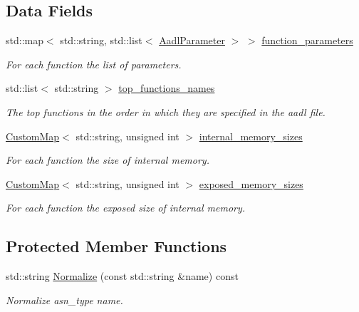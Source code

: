 \subsection*{Data Fields}
\begin{DoxyCompactItemize}
\item 
std\+::map$<$ std\+::string, std\+::list$<$ \hyperlink{structAadlInformation_1_1AadlParameter}{Aadl\+Parameter} $>$ $>$ \hyperlink{classAadlInformation_a3fd7b442c01a24407e5d51f2a1dc10f0}{function\+\_\+parameters}
\begin{DoxyCompactList}\small\item\em For each function the list of parameters. \end{DoxyCompactList}\item 
std\+::list$<$ std\+::string $>$ \hyperlink{classAadlInformation_a0fdd00ee4efacb6e9ff75022645321be}{top\+\_\+functions\+\_\+names}
\begin{DoxyCompactList}\small\item\em The top functions in the order in which they are specified in the aadl file. \end{DoxyCompactList}\item 
\hyperlink{custom__map_8hpp_a18ca01763abbe3e5623223bfe5aaac6b}{Custom\+Map}$<$ std\+::string, unsigned int $>$ \hyperlink{classAadlInformation_a5d37d5428bd5ec42ff0988a030e1f964}{internal\+\_\+memory\+\_\+sizes}
\begin{DoxyCompactList}\small\item\em For each function the size of internal memory. \end{DoxyCompactList}\item 
\hyperlink{custom__map_8hpp_a18ca01763abbe3e5623223bfe5aaac6b}{Custom\+Map}$<$ std\+::string, unsigned int $>$ \hyperlink{classAadlInformation_a94c5f5e4fe218bdb0ecb821a840246fd}{exposed\+\_\+memory\+\_\+sizes}
\begin{DoxyCompactList}\small\item\em For each function the exposed size of internal memory. \end{DoxyCompactList}\end{DoxyCompactItemize}
\subsection*{Protected Member Functions}
\begin{DoxyCompactItemize}
\item 
std\+::string \hyperlink{classAadlInformation_a26a3bb9e09194a9db389ebfdf507db88}{Normalize} (const std\+::string \&name) const
\begin{DoxyCompactList}\small\item\em Normalize asn\+\_\+type name. \end{DoxyCompactList}\end{DoxyCompactItemize}
